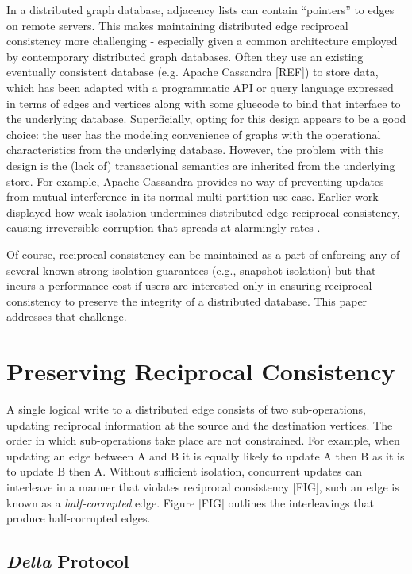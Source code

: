 \documentclass[sigplan,screen]{acmart}
\begin{document}
In a distributed graph database, adjacency lists can contain ``pointers'' to edges on remote servers. This makes maintaining distributed edge reciprocal consistency more challenging - especially given a common architecture employed by contemporary distributed graph databases. Often they use an existing eventually consistent database (e.g. Apache Cassandra [REF]) to store data, which has been adapted with a programmatic API or query language expressed in terms of edges and vertices along with some gluecode to bind that interface to the underlying database. Superficially, opting for this design appears to be a good choice: the user has the modeling convenience of graphs with the operational characteristics from the underlying database. However, the problem with this design is the (lack of) transactional semantics are inherited from the underlying store. For example, Apache Cassandra provides no way of preventing updates from mutual interference in its normal multi-partition use case. Earlier work displayed how weak isolation undermines distributed edge reciprocal consistency, causing irreversible corruption that spreads at alarmingly rates \cite{Ezhilchelvan2018}.

Of course, reciprocal consistency can be maintained as a part of enforcing any of several known strong isolation guarantees (e.g., snapshot isolation) but that incurs a performance cost if users are interested only in ensuring reciprocal consistency to preserve the integrity of a distributed database. This paper addresses that challenge.


\section{Preserving Reciprocal Consistency}


A single logical write to a distributed edge consists of two sub-operations, updating reciprocal information at the source and the destination vertices. The order in which sub-operations take place are not constrained. For example, when updating an edge between A and B it is equally likely to update A then B as it is to update B then A. Without sufficient isolation, concurrent updates can interleave in a manner that violates reciprocal consistency [FIG], such an edge is known as a \emph{half-corrupted} edge. Figure [FIG] outlines the interleavings that produce half-corrupted edges.


\subsection{\emph{Delta} Protocol}
\end{document}

